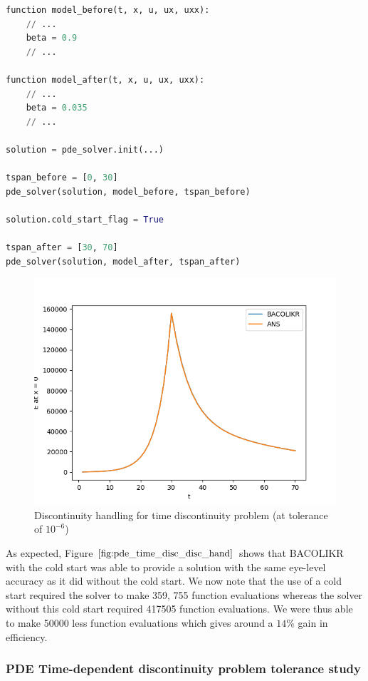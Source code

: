 \documentclass{article}
\begin{document}
\begin{minipage}{\linewidth}
\begin{lstlisting}[language=Python]
function model_before(t, x, u, ux, uxx):
    // ...
    beta = 0.9
    // ...
    
function model_after(t, x, u, ux, uxx):
    // ...
    beta = 0.035
    // ...

solution = pde_solver.init(...)

tspan_before = [0, 30]
pde_solver(solution, model_before, tspan_before)

solution.cold_start_flag = True

tspan_after = [30, 70]
pde_solver(solution, model_after, tspan_after)

\end{lstlisting}
\end{minipage}

\begin{figure}[H]
\centering
\includegraphics[width=0.7\linewidth]{./figures/pde_time_disc_disc_hand}
\caption{Discontinuity handling for time discontinuity problem (at tolerance of $10^{-6}$)}
\label{fig:pde_time_disc_disc_hand}
\end{figure}

As expected, Figure $\ref{fig:pde_time_disc_disc_hand}$ shows that BACOLIKR with the cold start was able to provide a solution with the same eye-level accuracy as it did without the cold start.
We now note that the use of a cold start required the solver to make 359, 755 function evaluations whereas the solver without this cold start required 417505 function evaluations. We were thus able to make 50000 less function evaluations which gives around a $14\%$ gain in efficiency.

\subsubsection{PDE Time-dependent discontinuity problem tolerance study}
\label{subsubsection:pde_time_tol}
\end{document}
